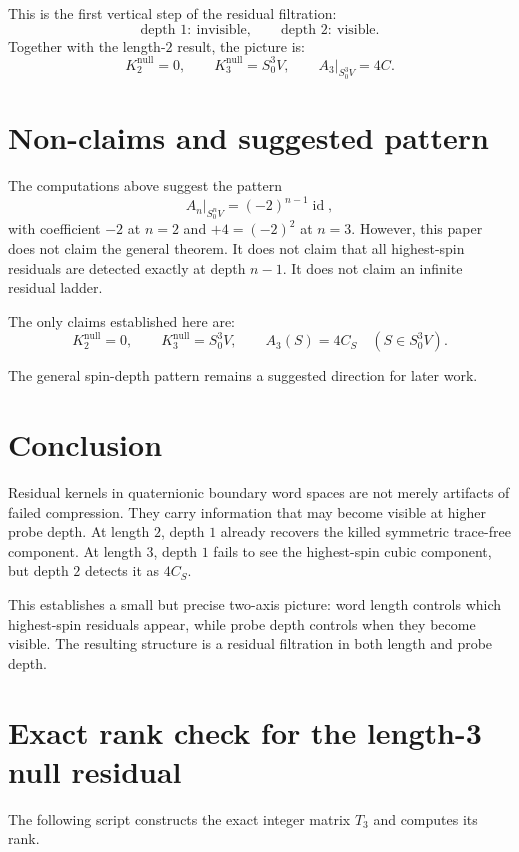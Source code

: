 \documentclass[11pt]{article}
\theoremstyle{definition}
\begin{document}
This is the first vertical step of the residual filtration:
\[
  \text{depth }1:\ \text{invisible},
  \qquad
  \text{depth }2:\ \text{visible}.
\]
Together with the length-$2$ result, the picture is:
\[
  K_2^{\mathrm{null}}=0,
  \qquad
  K_3^{\mathrm{null}}=S^3_0V,
  \qquad
  A_3|_{S^3_0V}=4C.
\]

\section{Non-claims and suggested pattern}

The computations above suggest the pattern
\[
  A_n|_{S^n_0V}=(-2)^{n-1}\operatorname{id},
\]
with coefficient $-2$ at $n=2$ and $+4=(-2)^2$ at $n=3$.
However, this paper does not claim the general theorem.
It does not claim that all highest-spin residuals are detected exactly at depth $n-1$.
It does not claim an infinite residual ladder.

The only claims established here are:
\[
  K_2^{\mathrm{null}}=0,
  \qquad
  K_3^{\mathrm{null}}=S^3_0V,
  \qquad
  A_3(S)=4C_S\quad(S\in S^3_0V).
\]

The general spin-depth pattern remains a suggested direction for later work.

\section{Conclusion}

Residual kernels in quaternionic boundary word spaces are not merely artifacts of failed compression.
They carry information that may become visible at higher probe depth.
At length $2$, depth $1$ already recovers the killed symmetric trace-free component.
At length $3$, depth $1$ fails to see the highest-spin cubic component, but depth $2$ detects it as $4C_S$.

This establishes a small but precise two-axis picture: word length controls which highest-spin residuals appear, while probe depth controls when they become visible.
The resulting structure is a residual filtration in both length and probe depth.

\appendix

\section{Exact rank check for the length-3 null residual}
\label{app:t3}

The following script constructs the exact integer matrix $T_3$ and computes its rank.
\end{document}
